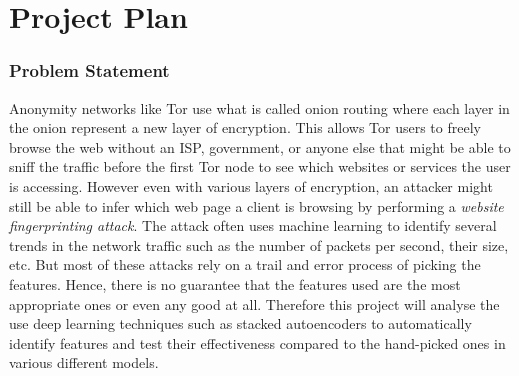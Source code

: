 \chapter{Project Plan}

\setcounter{secnumdepth}{5}
\begingroup

\renewcommand{\thesubsection}{\arabic{subsection}}

\renewcommand{\addcontentsline}[3]{}%

\subsection{Problem Statement}
Anonymity networks like Tor use what is called onion routing where each layer in the onion represent a new layer of encryption.
This allows Tor users to freely browse the web without an ISP, government, or anyone else that might be able to sniff the traffic before the first Tor node to see which websites or services the user is accessing.
However even with various layers of encryption, an attacker might still be able to infer which web page a client is browsing by performing a \textit{website fingerprinting attack}.
The attack often uses machine learning to identify several trends in the network traffic such as the number of packets per second, their size, etc.
But most of these attacks rely on a trail and error process of picking the features.
Hence, there is no guarantee that the features used are the most appropriate ones or even any good at all.
Therefore this project will analyse the use deep learning techniques such as stacked autoencoders to automatically identify features and test their effectiveness compared to the hand-picked ones in various different models.

